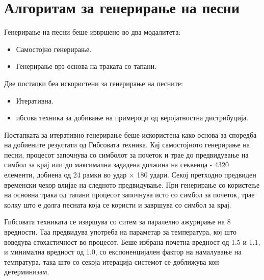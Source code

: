 \section{Алгоритам за генерирање на песни}

Генерирање на песни беше извршено во два модалитета: 
\begin{itemize}
    \item Самостојно генерирање.
    \item Генерирање врз основа на траката со тапани.
\end{itemize}

Две постапки беа искористени за генерирање на песните: 
\begin{itemize}
    \item Итеративна.
    \item ибсова техника за добивање на примероци од веројатностна дистрибуција.
\end{itemize}

Постапката за итеративно генерирање беше искористена како основа за споредба на добиените резултати од Гибсовата техника. Кај самостојното генерирање на песни, процесот започнува со симболот за почеток и трае до предвидување на симбол за крај или до максимална зададена должина на секвенца - 4320 елементи, добиена од 24 рамки во удар × 180 удари. Секој претходно предвиден временски чекор влијае на следното предвидување. При генерирање со користење на основна трака од тапани процесот започнува исто со симбол за почеток, трае колку што е долга песната која се користи и завршува со симбол за крај.

Гибсовата техниката се извршува со ситем за паралелно ажурирање на 8 вредности. Таа предвидува употреба на параметар за температура, кој што воведува стохастичност во процесот. Беше избрана почетна вредност од 1.5 и 1.1, и минимална вредност од 1.0, со експоненцијален фактор на намалување на темпратура, така што со секоја итерација системот се доближува кон детерминизам.

